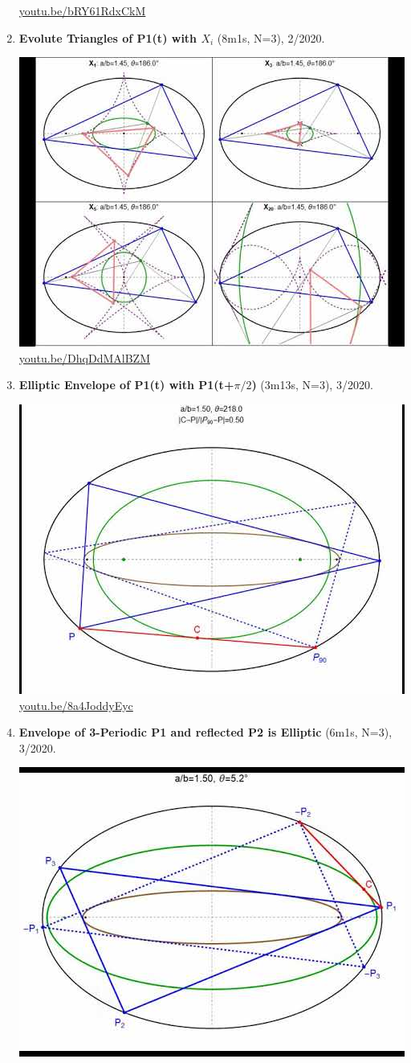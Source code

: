 \documentclass[12pt]{amsart}
\begin{document}
\begin{enumerate}[resume]
\begin{center}
\href{https://youtu.be/bRY61RdxCkM}{\url{youtu.be/bRY61RdxCkM}}\end{center}
% 
\item \textbf{Evolute Triangles of P1(t) with $X_i$} (8m1s, N=3), 2/2020. 
\begin{center}\includegraphics[width=.5\textwidth]{pics/DhqDdMAlBZM.jpg} \\ 
\href{https://youtu.be/DhqDdMAlBZM}{\url{youtu.be/DhqDdMAlBZM}}\end{center}
% 
\item \textbf{Elliptic Envelope of P1(t) with P1(t+$\pi/2$)} (3m13s, N=3), 3/2020. 
\begin{center}\includegraphics[width=.5\textwidth]{pics/8a4JoddyEyc.jpg} \\ 
\href{https://youtu.be/8a4JoddyEyc}{\url{youtu.be/8a4JoddyEyc}}\end{center}
% 
\item \textbf{Envelope of 3-Periodic P1 and reflected P2 is Elliptic} (6m1s, N=3), 3/2020. 
\begin{center}\includegraphics[width=.5\textwidth]{pics/GJgiUulX1aU.jpg} \\ 

\end{center}
\end{enumerate}
\end{document}
